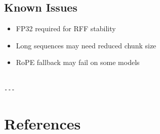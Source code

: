 \subsection{Known Issues}

\begin{itemize}
\item FP32 required for RFF stability
\item Long sequences may need reduced chunk size
\item RoPE fallback may fail on some models
\end{itemize}
\begin{lstlisting}

---
\end{lstlisting}


\section{References}

